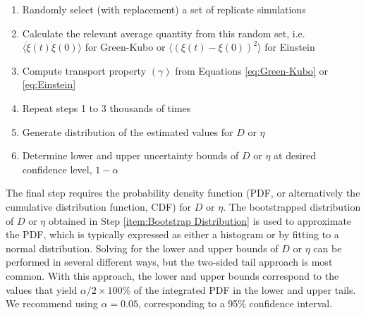 \documentclass[9pt,bestpractices]{livecoms}
\begin{document}
\begin{enumerate}
	\item Randomly select (with replacement) a set of replicate simulations
	\item Calculate the relevant average quantity from this random set, i.e. $\langle\dot{\xi}(t)\dot{\xi}(0)\rangle$ for Green-Kubo or $\langle (\xi(t)-\xi(0))^2 \rangle$ for Einstein
	\item Compute transport property $(\gamma)$ from Equations \ref{eq:Green-Kubo} or \ref{eq:Einstein}
	\item Repeat steps 1 to 3 thousands of times
	\item Generate distribution of the estimated values for $D$ or $\eta$ \label{item:Bootstrap Distribution}
	\item Determine lower and upper uncertainty bounds of $D$ or $\eta$ at desired confidence level, $1-\alpha$
\end{enumerate}
The final step requires the probability density function (PDF, or alternatively the cumulative distribution function, CDF) for $D$ or $\eta$. The bootstrapped distribution of $D$ or $\eta$ obtained in Step \ref{item:Bootstrap Distribution} is used to approximate the PDF, which is typically expressed as either a histogram or by fitting to a normal distribution. Solving for the lower and upper bounds of $D$ or $\eta$ can be performed in several different ways, but the two-sided tail approach is most common. With this approach, the lower and upper bounds correspond to the values that yield $\alpha/2 \times 100$\% of the integrated PDF in the lower and upper tails. We recommend using $\alpha = 0.05$, corresponding to a 95\% confidence interval.

%
\end{document}
